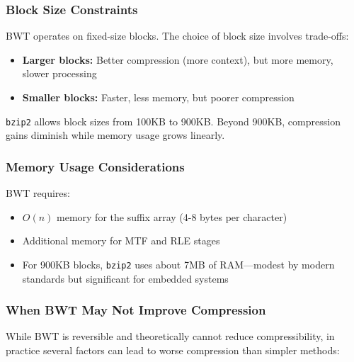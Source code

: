 \subsubsection{Block Size Constraints}

BWT operates on fixed-size blocks. The choice of block size involves trade-offs:

\begin{itemize}
    \item \textbf{Larger blocks:} Better compression (more context), but more memory, slower processing
    \item \textbf{Smaller blocks:} Faster, less memory, but poorer compression
\end{itemize}

\texttt{bzip2} allows block sizes from 100KB to 900KB. Beyond 900KB, compression gains diminish while memory usage grows linearly.

\subsubsection{Memory Usage Considerations}

BWT requires:
\begin{itemize}
    \item \(O(n)\) memory for the suffix array (4-8 bytes per character)
    \item Additional memory for MTF and RLE stages
    \item For 900KB blocks, \texttt{bzip2} uses about 7MB of RAM—modest by modern standards but significant for embedded systems
\end{itemize}

\subsubsection{When BWT May Not Improve Compression}

While BWT is reversible and theoretically cannot reduce compressibility, in practice several factors can lead to worse compression than simpler methods:

